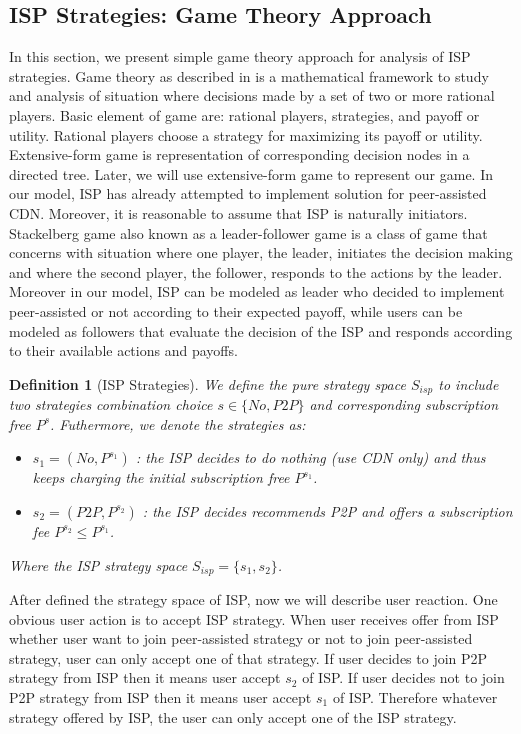 \documentclass[paper]{ieice}
\begin{document}
\subsection{ISP Strategies: Game Theory Approach}
In this section, we present simple game theory approach for analysis of ISP strategies.
Game theory as described in \cite{gametheory} is a mathematical framework to study and analysis of situation where decisions made by a set of two or more rational players.
Basic element of game are: rational players, strategies, and payoff or utility.  
Rational players choose a strategy for maximizing its payoff or utility. 
Extensive-form game is representation of corresponding decision nodes in a directed tree.
Later, we will use extensive-form game to represent our game.
In our model, ISP has already attempted to implement solution for peer-assisted CDN.
Moreover, it is reasonable to assume that ISP is naturally initiators.  
Stackelberg game also known as a leader-follower game is a class of game that concerns with situation where one player, the leader, initiates the decision making and where the second player, the follower, responds to the actions by the leader.  
Moreover in our model, ISP can be modeled as leader who decided to implement peer-assisted or not according to their expected payoff, while users can be modeled as followers that evaluate the decision of the ISP and responds according to their available actions and payoffs.

\newtheorem{theorem}{Definition}
\begin{theorem}[ISP Strategies]
We define the pure strategy space $S_{isp}$ to include two strategies combination choice $s \in \{No, P2P\}$ and corresponding subscription free $P^{s}$.
Futhermore, we denote the strategies as:
\begin{itemize}
	\item $s_1 = (No, P^{s_1})$ : the ISP decides to do nothing (use CDN only) and thus keeps charging the initial subscription free $P^{s_1}$.
	\item $s_2 = (P2P, P^{s_2})$ : the ISP decides recommends P2P and offers a subscription fee $P^{s_2} \le P^{s_1}$.
\end{itemize}
Where the ISP strategy space $S_{isp} = \{s_1,s_2\}$.
\end{theorem}

After defined the strategy space of ISP, now we will describe user reaction.
One obvious user action is to accept ISP strategy.
When user receives offer from ISP whether user want to join peer-assisted strategy or not to join peer-assisted strategy, user can only accept one of that strategy.  
If user decides to join P2P strategy from ISP then it means user accept $s_2$ of ISP.
If user decides not to join P2P strategy from ISP then it means user accept $s_1$ of ISP.
Therefore whatever strategy offered by ISP, the user can only accept one of the ISP strategy.
\end{document}
